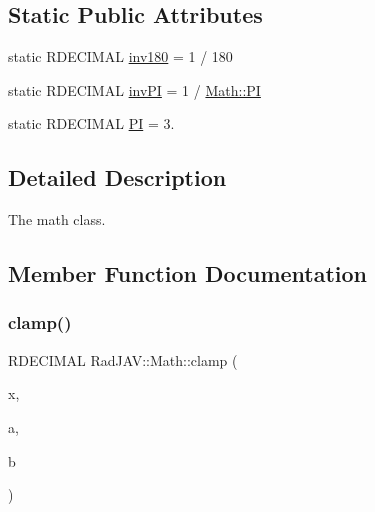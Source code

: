 \subsection*{Static Public Attributes}
\begin{DoxyCompactItemize}
\item 
static R\+D\+E\+C\+I\+M\+AL \mbox{\hyperlink{class_rad_j_a_v_1_1_math_a111cdbf530eeb8720f5dfca364d9f346}{inv180}} = 1 / 180
\item 
static R\+D\+E\+C\+I\+M\+AL \mbox{\hyperlink{class_rad_j_a_v_1_1_math_af92273fdf8e3673d9f4132ef6e76d033}{inv\+PI}} = 1 / \mbox{\hyperlink{class_rad_j_a_v_1_1_math_adcedcfba45466c6793acb2b80ffccfed}{Math\+::\+PI}}
\item 
static R\+D\+E\+C\+I\+M\+AL \mbox{\hyperlink{class_rad_j_a_v_1_1_math_adcedcfba45466c6793acb2b80ffccfed}{PI}} = 3.
\end{DoxyCompactItemize}


\subsection{Detailed Description}
The math class. 

\subsection{Member Function Documentation}
\mbox{\label{class_rad_j_a_v_1_1_math_a9f1e2cfa6ad81c8abdee92b1c6a0b3c9}} 
\subsubsection{\texorpdfstring{clamp()}{clamp()}}
{\footnotesize\ttfamily R\+D\+E\+C\+I\+M\+AL Rad\+J\+A\+V\+::\+Math\+::clamp (\begin{DoxyParamCaption}\item[{R\+D\+E\+C\+I\+M\+AL}]{x,  }\item[{R\+D\+E\+C\+I\+M\+AL}]{a,  }\item[{R\+D\+E\+C\+I\+M\+AL}]{b }\end{DoxyParamCaption})\hspace{0.3cm}{\ttfamily [static]}}

\mbox{\label{class_rad_j_a_v_1_1_math_a6ebdaee4807addaa0f8b359be7567eda}} 
